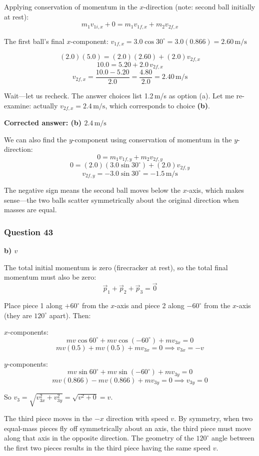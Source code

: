 \documentclass[12pt,letterpaper]{article}
\begin{document}
\begin{explanationbox}
Applying conservation of momentum in the $x$-direction (note: second ball initially at rest):
\[
m_1 v_{1i,x} + 0 = m_1 v_{1f,x} + m_2 v_{2f,x}
\]

The first ball's final $x$-component: $v_{1f,x} = 3.0\cos 30^\circ = 3.0(0.866) = 2.60\,\text{m/s}$

\[
(2.0)(5.0) = (2.0)(2
.60) + (2.0)v_{2f,x}
\]
\[
10.0 = 5.20 + 2.0\,v_{2f,x}
\]
\[
v_{2f,x} = \frac{10.0 - 5.20}{2.0} = \frac{4.80}{2.0} = 2.40\,\text{m/s}
\]

Wait---let us recheck. The answer choices list 1.2\,m/s as option (a). Let me re-examine: actually $v_{2f,x} = 2.4\,\text{m/s}$, which corresponds to choice \textbf{(b)}.

\textbf{Corrected answer: (b) $2.4\,\text{m/s}$}

We can also find the $y$-component using conservation of momentum in the $y$-direction:
\[
0 = m_1 v_{1f,y} + m_2 v_{2f,y}
\]
\[
0 = (2.0)(3.0\sin 30^\circ) + (2.0)v_{2f,y}
\]
\[
v_{2f,y} = -3.0\sin 30^\circ = -1.5\,\text{m/s}
\]

The negative sign means the second ball moves below the $x$-axis, which makes sense---the two balls scatter symmetrically about the original direction when masses are equal.
\end{explanationbox}

\subsubsection*{Question 43}

\begin{answerbox}
\textbf{b) $v$}
\end{answerbox}

\begin{explanationbox}
The total initial momentum is zero (firecracker at rest), so the total final momentum must also be zero:
\[
\vec{p}_1 + \vec{p}_2 + \vec{p}_3 = \vec{0}
\]

Place piece 1 along $+60^\circ$ from the $x$-axis and piece 2 along $-60^\circ$ from the $x$-axis (they are $120^\circ$ apart). Then:

$x$-components:
\[
mv\cos 60^\circ + mv\cos(-60^\circ) + mv_{3x} = 0
\]
\[
mv(0.5) + mv(0.5) + mv_{3x} = 0 \implies v_{3x} = -v
\]

$y$-components:
\[
mv\sin 60^\circ + mv\sin(-60^\circ) + mv_{3y} = 0
\]
\[
mv(0.866) - mv(0.866) + mv_{3y} = 0 \implies v_{3y} = 0
\]

So $v_3 = \sqrt{v_{3x}^2 + v_{3y}^2} = \sqrt{v^2 + 0} = v$.

The third piece moves in the $-x$ direction with speed $v$. By symmetry, when two equal-mass pieces fly off symmetrically about an axis, the third piece must move along that axis in the opposite direction. The geometry of the $120^\circ$ angle between the first two pieces results in the third piece having the same speed $v$.
\end{explanationbox}
\end{document}
